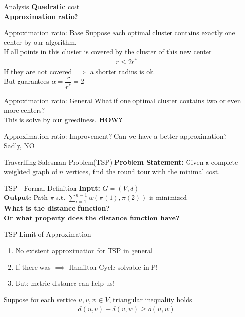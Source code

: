 \documentclass{beamer}
\newcommand*{\brk}{\\[10pt]}
\begin{document}
\begin{frame}{Analysis}
    \textbf{Quadratic} cost
    \pause\brk
    \textbf{Approximation ratio?}
\end{frame}

\begin{frame}{Approximation ratio: Base}
    Suppose each optimal cluster contains exactly one center by our algorithm.\brk
    \pause
    If all points in this cluster is covered by the cluster of this new center
    \begin{align*}
        r \leq 2r^*        
    \end{align*}
    If they are not covered $\implies$ a shorter radius is ok. \brk
    \pause 
    But guarantees $\alpha = \dfrac{r}{r^*} = 2$ 
\end{frame}

\begin{frame}{Approximation ratio: General}
    What if one optimal cluster contains two or even more centers? \brk 
    This is solve by our greediness. \textbf{HOW?}
\end{frame}

\begin{frame}{Approximation ratio: Improvement?}
    Can we have a better approximation? \brk
    Sadly, NO
\end{frame}


\begin{frame}{Traverlling Salesman Problem(TSP)}
    \textbf{Problem Statement:} Given a complete weighted graph of $n$ vertices, find the round tour with the minimal cost. 
\end{frame}

\begin{frame}{TSP - Formal Definition}
    \textbf{Input:} $G = (V, d)$ \\
    \textbf{Output:} Path $\pi$ s.t. $\sum_{i = 1}^{n-1} w(\pi(1), \pi(2))$
    is minimized \\[20pt]
    \pause 
    \textbf{What is the distance function? \\ Or what property does the distance function have?}
\end{frame}

\begin{frame}{TSP-Limit of Approximation}
    \begin{enumerate}
        \item<1-3> No existent approximation for TSP in general 
        \item<2-3> If there was $\implies$ Hamilton-Cycle solvable in P!
        \item<3> But: metric distance can help us!
    \end{enumerate}
    \pause 
    Suppose for each vertice $u, v, w \in V$, triangular inequality holds
    \begin{align*}
        d(u, v) + d(v, w) \geq d(u, w)
    \end{align*}
\end{frame}
\end{document}
